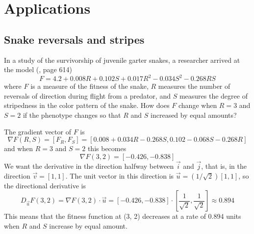 \section{Applications}
\subsection{Snake reversals and stripes}
In a study of the survivorship of juvenile garter snakes, a researcher arrived at the model (\cite{calculus}, page 614)
$$
    F = 4.2 + 0.008R + 0.102S + 0.017R^2 - 0.034S^2 - 0.268RS
$$
where $F$ is a measure of the fitness of the snake, $R$ measures the number of reversals of direction during flight from a predator, and $S$ measures the degree of stripedness in the color pattern of the snake. How does $F$ change when $R=3$ and $S=2$ if the phenotype changes so that $R$ and $S$ increased by equal amounts?

The gradient vector of $F$ is
$$
    \nabla F(R, S) = [F_R, F_S] = [0.008 + 0.034R - 0.268S, 0.102 - 0.068S - 0.268R]
$$
and when $R=3$ and $S=2$ this becomes
$$
    \nabla F(3, 2) = [-0.426, -0.838]
$$
We want the derivative in the direction halfway between $\vec{i}$ and $\vec{j}$, that is, in the direction $\vec{v}=[1, 1]$. The unit vector in this direction is $\vec{u}=(1/\sqrt{2})[1, 1]$, so the directional derivative is
$$
    D_{\vec{u}}F(3, 2)=\nabla F(3, 2) \cdot \vec{u}=[-0.426, -0.838] \cdot [\frac{1}{\sqrt{2}}, \frac{1}{\sqrt{2}}]
    \approx 0.894
$$
This means that the fitness function at (3, 2) decreases at a rate of 0.894 units when $R$ and $S$ increase by equal amount.